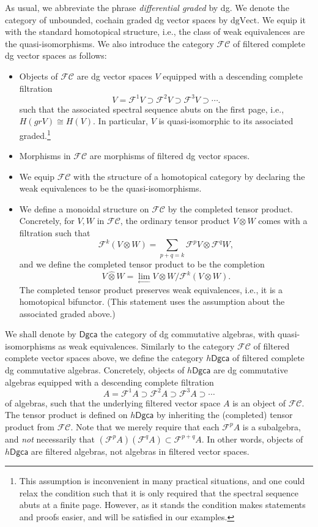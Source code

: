 \documentclass[a4paper]{amsart}
\theoremstyle{plain}
\theoremstyle{definition}
\newcommand{\dgca}{\mathsf{Dgca}}
\newcommand{\mF}{\mathcal{F}}
\newcommand{\dgVect}{\mathrm{dgVect}}
\newcommand{\FC}{\mathcal{FC}}
\newcommand{\gr}{\mathit{gr}}
\newcommand{\hdgca}{h\dgca}
\begin{document}
As usual, we abbreviate the phrase \emph{differential graded} by dg.
We denote the category of unbounded, cochain graded dg vector spaces by $\dgVect$.
We equip it with the standard homotopical structure, i.e., the class of weak equivalences are the quasi-isomorphisms.
We also introduce the category $\FC$ of filtered complete dg vector spaces as follows:
\begin{itemize}
 \item Objects of $\FC$ are dg vector spaces $V$ equipped with a descending complete filtration 
\[
 V=\mF^1V \supset \mF^2V\supset \mF^3V\supset \cdots .
\]
such that the associated spectral sequence abuts on the first page, i.e., $H(\gr V)\cong H(V)$. In particular, $V$ is quasi-isomorphic to its associated graded.\footnote{This assumption is inconvenient in many practical situations, and one could relax the condition such that it is only required that the spectral sequence abuts at a finite page. However, as it stands the condition makes statements and proofs easier, and will be satisfied in our examples.}
\item Morphisms in $\FC$ are morphisms of filtered dg vector spaces.
\item We equip $\FC$ with the structure of a homotopical category by declaring the weak equivalences to be the quasi-isomorphisms.
\item We define a monoidal structure on $\FC$ by the completed tensor product.
Concretely, for $V,W$ in $\FC$, the ordinary tensor product $V\otimes W$ comes with a filtration such that 
\[
\mF^k (V\otimes W) = \sum_{p+q=k} \mF^pV\otimes \mF^qW,
\]
and we define the completed tensor product to be the completion 
\[
 V\hat \otimes W = \lim_{\leftarrow} V\otimes W / \mF^k (V\otimes W).
\]
The completed tensor product preserves weak equivalences, i.e., it is a homotopical bifunctor. (This statement uses the assumption about the associated graded above.)
\end{itemize}

We shall denote by $\dgca$ the category of dg commutative algebras, with quasi-isomorphisms as weak equivalences.
Similarly to the category $\FC$ of filtered complete vector spaces above, we define the category $\hdgca$ of filtered complete dg commutative algebras.
Concretely, objects of $\hdgca$ are dg commutative algebras equipped with a descending complete filtration 
\[
  A=\mF^1A \supset \mF^2A\supset \mF^3A\supset \cdots 
\]
of algebras, such that the underlying filtered vector space $A$ is an object of $\FC$.
The tensor product is defined on $\hdgca$ by inheriting the (completed) tensor product from $\FC$.
Note that we merely require that each $\mF^pA$ is a subalgebra, and \emph{not} necessarily that $(\mF^pA)(\mF^qA) \subset \mF^{p+q}A$.
In other words, objects of $\hdgca$ are filtered algebras, not algebras in filtered vector spaces.
\end{document}
